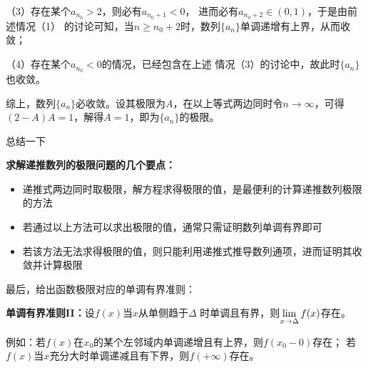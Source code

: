 （3）存在某个$a_{n_0}>2$，则必有$a_{n_0+1}<0$，
进而必有$a_{n_0+2}\in(0,1)$，于是由前述情况（1）
的讨论可知，当$n\geq n_0+2$时，数列$\{a_n\}$单调递增有上界，从而收敛；

（4）存在某个$a_{n_0}<0$的情况，已经包含在上述
情况（3）的讨论中，故此时$\{a_n\}$也收敛。

综上，数列$\{a_n\}$必收敛。设其极限为$A$，在以上等式两边同时令$n\to\infty$，可得
$(2-A)A=1$，解得$A=1$，即为$\{a_n\}$的极限。\fin
\fi

总结一下
\begin{thx}
	{\bf 求解递推数列的极限问题的几个要点：}
	\begin{itemize}
	  \item 递推式两边同时取极限，解方程求得极限的值，是最便利的计算递推数列极限的方法
	  \item 若通过以上方法可以求出极限的值，通常只需证明数列单调有界即可
	  \item 若该方法无法求得极限的值，则只能利用递推式推导数列通项，进而证明其收敛并计算极限
	\end{itemize}
\end{thx}

\bs
最后，给出函数极限对应的单调有界准则：
\begin{thx}
{\bf 单调有界准则II：}设$f(x)$当$x$从单侧趋于$\Delta$
时单调且有界，则$\lim\limits_{x\to{\Delta}}f(x)$存在。
\end{thx}

例如：若$f(x)$在$x_0$的某个左邻域内单调递增且有上界，则$f(x_0-0)$存在；
若$f(x)$当$x$充分大时单调递减且有下界，则$f(+\infty)$存在。

